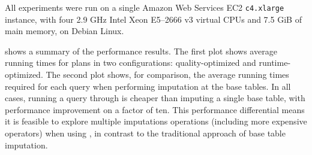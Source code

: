 %  

All experiments were run on a single Amazon Web Services EC2 {\tt c4.xlarge} instance, with
four 2.9 GHz Intel Xeon E5--2666 v3 virtual CPUs and 7.5 GiB of main memory, on Debian Linux.

 shows a summary of the performance results. The first plot
shows average running times for \ProjectName{} plans in two configurations:
quality-optimized and runtime-optimized. The second plot shows, for comparison, the average
running times required for each query when performing imputation at the base tables.  In all
cases, running a query through \ProjectName{} is cheaper than imputing a single base table,
with performance improvement on a factor of ten. This performance differential means it is feasible
to explore multiple imputations operations (including more expensive operators) when using
\ProjectName{}, in contrast to the traditional approach of base table imputation.

